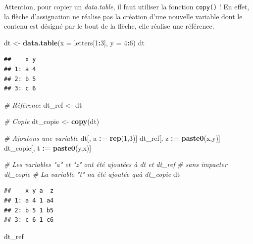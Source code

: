 \documentclass[
  11pt,
]{book}
\newenvironment{Shaded}{\begin{snugshade}}{\end{snugshade}}
\newcommand{\CommentTok}[1]{\textcolor[rgb]{0.56,0.35,0.01}{\textit{#1}}}
\newcommand{\DataTypeTok}[1]{\textcolor[rgb]{0.13,0.29,0.53}{#1}}
\newcommand{\DecValTok}[1]{\textcolor[rgb]{0.00,0.00,0.81}{#1}}
\newcommand{\ErrorTok}[1]{\textcolor[rgb]{0.64,0.00,0.00}{\textbf{#1}}}
\newcommand{\KeywordTok}[1]{\textcolor[rgb]{0.13,0.29,0.53}{\textbf{#1}}}
\newcommand{\NormalTok}[1]{#1}
\newcommand{\OperatorTok}[1]{\textcolor[rgb]{0.81,0.36,0.00}{\textbf{#1}}}
\newcommand{\StringTok}[1]{\textcolor[rgb]{0.31,0.60,0.02}{#1}}
\numberwithin{equation}{section}
\numberwithin{countremarque}{section}
\begin{document}
Attention, pour copier un \emph{data.table}, il faut utiliser la fonction \texttt{copy()} ! En effet, la flèche d'assignation ne réalise pas la création d'une nouvelle variable dont le contenu est désigné par le bout de la flèche, elle réalise une référence.

\begin{Shaded}
\begin{Highlighting}[]
\NormalTok{dt \textless{}{-}}\StringTok{ }\KeywordTok{data.table}\NormalTok{(}\DataTypeTok{x =}\NormalTok{ letters[}\DecValTok{1}\OperatorTok{:}\DecValTok{3}\NormalTok{], }\DataTypeTok{y =} \DecValTok{4}\OperatorTok{:}\DecValTok{6}\NormalTok{)}
\NormalTok{dt}
\end{Highlighting}
\end{Shaded}

\begin{lstlisting}
##    x y
## 1: a 4
## 2: b 5
## 3: c 6
\end{lstlisting}

\begin{Shaded}
\begin{Highlighting}[]
\CommentTok{\# Référence}
\NormalTok{dt\_ref \textless{}{-}}\StringTok{ }\NormalTok{dt}

\CommentTok{\# Copie}
\NormalTok{dt\_copie \textless{}{-}}\StringTok{ }\KeywordTok{copy}\NormalTok{(dt)}

\CommentTok{\# Ajoutons une variable}
\NormalTok{dt[, a }\OperatorTok{:}\ErrorTok{=}\StringTok{ }\KeywordTok{rep}\NormalTok{(}\DecValTok{1}\NormalTok{,}\DecValTok{3}\NormalTok{)]}
\NormalTok{dt\_ref[, z }\OperatorTok{:}\ErrorTok{=}\StringTok{ }\KeywordTok{paste0}\NormalTok{(x,y)]}
\NormalTok{dt\_copie[, t }\OperatorTok{:}\ErrorTok{=}\StringTok{ }\KeywordTok{paste0}\NormalTok{(y,x)]}

\CommentTok{\# Les variables "a" et "z" ont été ajoutées à dt et dt\_ref}
\CommentTok{\# sans impacter dt\_copie}
\CommentTok{\# La variable "t" n\textquotesingle{}a été ajoutée qu\textquotesingle{}à dt\_copie}
\NormalTok{dt}
\end{Highlighting}
\end{Shaded}

\begin{lstlisting}
##    x y a  z
## 1: a 4 1 a4
## 2: b 5 1 b5
## 3: c 6 1 c6
\end{lstlisting}

\begin{Shaded}
\begin{Highlighting}[]
\NormalTok{dt\_ref}
\end{Highlighting}
\end{Shaded}
\end{document}
